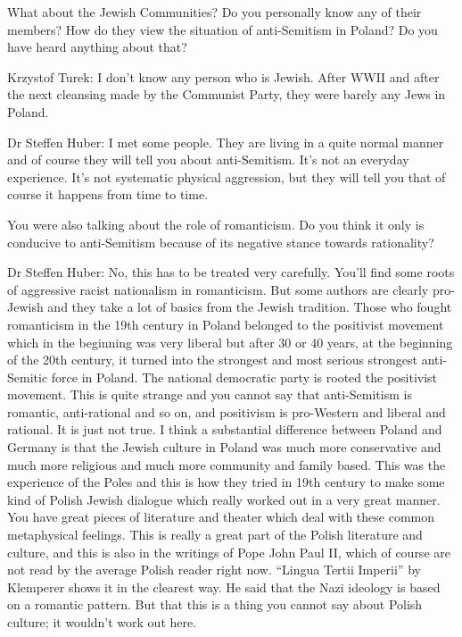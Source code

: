  

What about the Jewish Communities? Do you personally know any of their members? How do they view the situation of anti-Semitism in Poland? Do you have heard anything about that?  

 

Krzystof Turek: I don’t know any person who is Jewish. After WWII and after the next cleansing made by the Communist Party, they were barely any Jews in Poland.  

Dr Steffen Huber: I met some people. They are living in a quite normal manner and of course they will tell you about anti-Semitism. It’s not an everyday experience. It's not systematic physical aggression, but they will tell you that of course it happens from time to time. 

 

 You were also talking about the role of romanticism. Do you think it only is conducive to anti-Semitism because of its negative stance towards rationality? 

 

Dr Steffen Huber: No, this has to be treated very carefully. You’ll find some roots of aggressive racist nationalism in romanticism. But some authors are clearly pro-Jewish and they take a lot of basics from the Jewish tradition. Those who fought romanticism in the 19th century in Poland belonged to the positivist movement which in the beginning was very liberal but after 30 or 40 years, at the beginning of the 20th century, it turned into the strongest and most serious strongest anti-Semitic force in Poland. The national democratic party is rooted the positivist movement. This is quite strange and you cannot say that anti-Semitism is romantic, anti-rational and so on, and positivism is pro-Western and liberal and rational. It is just not true. I think a substantial difference between Poland and Germany is that the Jewish culture in Poland was much more conservative and much more religious and much more community and family based. This was the experience of the Poles and this is how they tried in 19th century to make some kind of Polish Jewish dialogue which really worked out in a very great manner.  You have great pieces of literature and theater which deal with these common metaphysical feelings. This is really a great part of the Polish literature and culture, and this is also in the writings of Pope John Paul II, which of course are not read by the average Polish reader right now. “Lingua Tertii Imperii” by Klemperer shows it in the clearest way. He said that the Nazi ideology is based on a romantic pattern. But that this is a thing you cannot say about Polish culture; it wouldn't work out here.  

